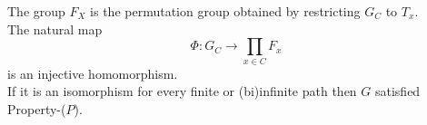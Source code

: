 \documentclass[preview]{standalone}
\begin{document}
The group $F_{X}$ is the permutation group obtained by restricting $G_{C}$ to $T_{x}$.\\The natural map \[\Phi : G_{C} \to \prod_{x \in C} F_{x}\] is an injective homomorphism.\\If it is an isomorphism for every finite or (bi)infinite path then $G$ satisfied Property-($P$).\\
\end{document}
